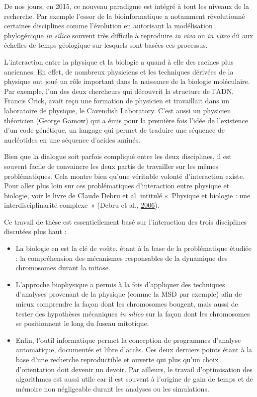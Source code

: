 \documentclass[12pt,a4paper,twoside,openright]{book}
\begin{document}
De nos jours, en 2015, ce nouveau paradigme est intégré à tout les
niveaux de la recherche. Par exemple l'essor de la bioinformatique a
notamment révolutionné certaines disciplines comme l'évolution en
autorisant la modélisation phylogénique \emph{in silico} souvent très
difficile à reproduire \emph{in vivo} ou \emph{in vitro} dû aux échelles
de temps géologique sur lesquels sont basées ces processus.

L'interaction entre la physique et la biologie a quand à elle des
racines plus anciennes. En effet, de nombreux physiciens et les
techniques dérivées de la physique ont joué un rôle important dans la
naissance de la biologie moléculaire. Par exemple, l'un des deux
chercheurs qui découvrit la structure de l'ADN, Francis Crick, avait
reçu une formation de physicien et travaillait dans un laboratoire de
physique, le Cavendish Laboratory. C'est aussi un physicien théoricien
(George Gamow) qui a émis pour la première fois l'idée de l'existence
d'un code génétique, un langage qui permet de traduire une séquence de
nucléotides en une séquence d'acides aminés.

Bien que la dialogue soit parfois compliqué entre les deux disciplines,
il est souvent facile de convaincre les deux partis de travailler sur
les mêmes problématiques. Cela montre bien qu'une véritable volonté
d'interaction existe. Pour aller plus loin sur ces problématiques
d'interaction entre physique et biologie, voir le livre de Claude Debru
et al. intitulé «~Physique et biologie : une interdisciplinarité
complexe~» (Debru et al., \protect\hyperlink{ref-Debru}{2006}).

Ce travail de thèse est essentiellement basé sur l'interaction des trois
disciplines discutées plus haut :

\begin{itemize}
\item
  La biologie en est la clé de voûte, étant à la base de la
  problématique étudiée : la compréhension des mécanismes responsables
  de la dynamique des chromosomes durant la mitose.
\item
  L'approche biophysique a permis à la fois d'appliquer des techniques
  d'analyses provenant de la physique (comme la MSD par exemple) afin de
  mieux comprendre la façon dont les chromosomes bougent, mais aussi de
  tester des hypothèses mécaniques \emph{in silico} sur la façon dont
  les chromosomes se positionnent le long du fuseau mitotique.
\item
  Enfin, l'outil informatique permet la conception de programmes
  d'analyse automatique, documentés et libre d'accès. Ces deux derniers
  points étant à la base d'une recherche reproductible et ouverte qui
  plus qu'un choix d'orientation doit devenir un devoir. Par ailleurs,
  le travail d'optimisation des algorithmes est aussi utile car il est
  souvent à l'origine de gain de temps et de mémoire non négligeable
  durant les analyses ou les simulations.
\end{itemize}
\end{document}
